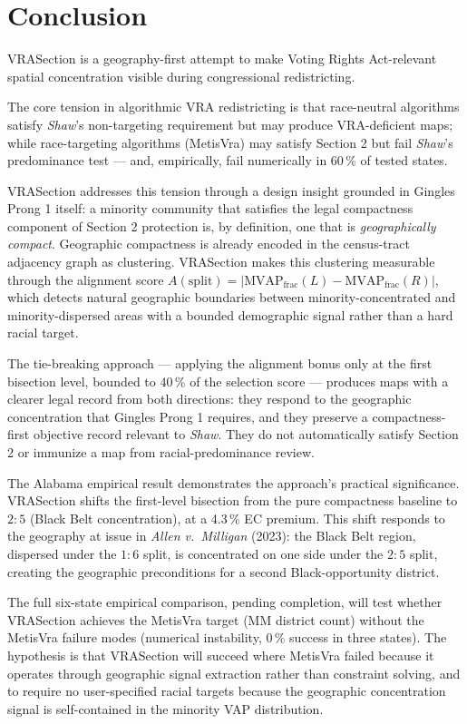\section{Conclusion}
\label{sec:conclusion}

VRASection is a geography-first attempt to make Voting Rights Act-relevant
spatial concentration visible during congressional redistricting.

The core tension in algorithmic VRA redistricting is that race-neutral
algorithms satisfy \emph{Shaw}'s non-targeting requirement but may produce
VRA-deficient maps; while race-targeting algorithms (MetisVra) may satisfy
Section 2 but fail \emph{Shaw}'s predominance test --- and, empirically,
fail numerically in 60\,\% of tested states.

VRASection addresses this tension through a design insight grounded in
Gingles Prong 1 itself: a minority community that satisfies the legal
compactness component of Section 2 protection is, by definition, one that is
\emph{geographically compact}.
Geographic compactness is already encoded in the census-tract adjacency
graph as clustering.
VRASection makes this clustering measurable through the alignment score
$A(\text{split}) = |\mathrm{MVAP}_\text{frac}(L) - \mathrm{MVAP}_\text{frac}(R)|$,
which detects natural geographic boundaries between minority-concentrated
and minority-dispersed areas with a bounded demographic signal rather than a
hard racial target.

The tie-breaking approach --- applying the alignment bonus only at the
first bisection level, bounded to 40\,\% of the selection score --- produces
maps with a clearer legal record from both directions:
they respond to the geographic concentration that Gingles Prong 1 requires,
and they preserve a compactness-first objective record relevant to
\emph{Shaw}.  They do not automatically satisfy Section 2 or immunize a map
from racial-predominance review.

The Alabama empirical result demonstrates the approach's practical significance.
VRASection shifts the first-level bisection from the pure compactness baseline
to $2:5$ (Black Belt concentration), at a 4.3\,\% EC premium.
This shift responds to the geography at issue in \emph{Allen v.\ Milligan} (2023):
the Black Belt region, dispersed under the $1:6$ split, is concentrated on
one side under the $2:5$ split, creating the geographic preconditions for
a second Black-opportunity district.

The full six-state empirical comparison, pending completion, will test whether
VRASection achieves the MetisVra target (MM district count) without the
MetisVra failure modes (numerical instability, 0\,\% success in three states).
The hypothesis is that VRASection will succeed where MetisVra failed because it operates
through geographic signal extraction rather than constraint solving,
and to require no user-specified racial targets because the geographic
concentration signal is self-contained in the minority VAP distribution.

